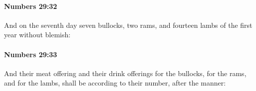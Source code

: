 		\paragraph{Numbers 29:32} %
			\label{NUMBERS-29-32}

			And on the seventh day seven bullocks, two rams, and fourteen lambs of the first year without blemish:


		\paragraph{Numbers 29:33} %
			\label{NUMBERS-29-33}

			And their meat offering and their drink offerings for the bullocks, for the rams, and for the lambs, shall be according to their number, after the manner:



